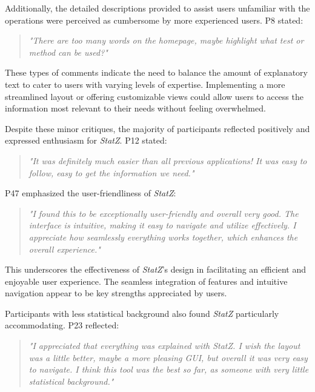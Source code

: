 \documentclass{article}
\begin{document}
Additionally, the detailed descriptions provided to assist users unfamiliar with the operations were perceived as cumbersome by more experienced users. P8 stated:

\begin{quote} \emph{"There are too many words on the homepage, maybe highlight what test or method can be used?" } \end{quote}

These types of comments indicate the need to balance the amount of explanatory text to cater to users with varying levels of expertise. Implementing a more streamlined layout or offering customizable views could allow users to access the information most relevant to their needs without feeling overwhelmed.

Despite these minor critiques, the majority of participants reflected positively and expressed enthusiasm for \textit{StatZ}. P12 stated:

\begin{quote} \emph{"It was definitely much easier than all previous applications! It was easy to follow, easy to get the information we need." } \end{quote}

P47 emphasized the user-friendliness of \textit{StatZ}:

\begin{quote} \emph{"I found this to be exceptionally user-friendly and overall very good. The interface is intuitive, making it easy to navigate and utilize effectively. I appreciate how seamlessly everything works together, which enhances the overall experience." } \end{quote}

This underscores the effectiveness of \textit{StatZ}'s design in facilitating an efficient and enjoyable user experience. The seamless integration of features and intuitive navigation appear to be key strengths appreciated by users.

Participants with less statistical background also found \textit{StatZ} particularly accommodating. P23 reflected:

\begin{quote} \emph{"I appreciated that everything was explained with \textit{StatZ}. I wish the layout was a little better, maybe a more pleasing GUI, but overall it was very easy to navigate. I think this tool was the best so far, as someone with very little statistical background." } \end{quote}
\end{document}
